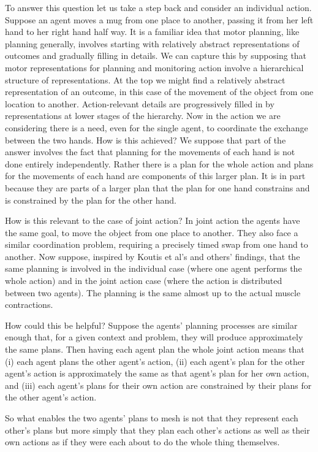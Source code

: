 \documentclass[12pt,\papersize]{extarticle}
\begin{document}
To answer this question
let us take a step back and consider an individual action.
Suppose an agent moves a mug from one place to another, passing it from her left hand to her right hand half way.
It is a familiar idea that motor planning, like planning generally, involves starting with relatively abstract representations of outcomes and gradually filling in details.
We can capture this by supposing that 
motor representations for planning and monitoring action involve a hierarchical structure of representations.
At the top we might find a relatively abstract representation of an outcome, in this case of the movement of the object from one location to another.
Action-relevant details are progressively filled in by representations at lower stages of the hierarchy. 
Now in the action we are considering there is a need, even for the single agent, to coordinate the exchange between the two hands.
How is this achieved? 
We suppose that part of the answer involves the fact that planning for the movements of each hand is not done entirely independently.
Rather there is a plan for the whole action
and plans for the movements of each hand are components of this larger plan.
It is in part because they are parts of a larger plan that the plan for one hand constrains and is constrained by the plan for the other hand.


How is this relevant to the case of joint action?
In joint action the agents have the same goal, to move the object from one place to another.
They also face a similar coordination problem, requiring a precisely timed swap from one hand to another.
Now suppose, 
inspired by Koutis et al’s and others' findings,
that the same planning is involved in the individual case (where one agent performs the whole action) and in the joint action case (where the action is distributed between two agents).
The planning is the same almost up to the actual muscle contractions.

How could this be helpful?
Suppose the agents' planning processes are similar enough that, for a given context and problem, they will produce approximately the same plans.
Then having each agent plan the whole joint action means that (i) each agent plans the other agent's action,
(ii) each agent's plan for the other agent's action is approximately the same as that agent's plan for her own action,
and 
(iii) each  agent's plans for their own action are constrained by their plans for the other agent's action.

So what enables the two agents' plans to mesh is not that they represent each other's plans but more simply that they plan each other's actions as well as their own actions as if they were each about to do the whole thing themselves.
\end{document}
